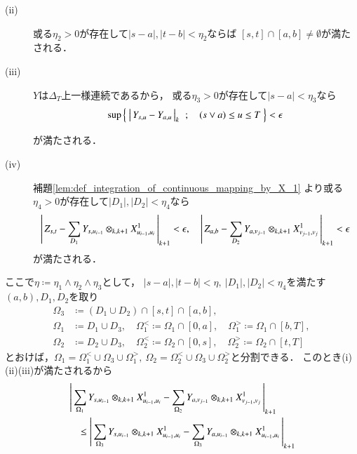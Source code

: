 \begin{prf}
\begin{description}
\begin{description}
					\item[(ii)] 或る$\eta_2 > 0$が存在して$|s-a|,|t-b| < \eta_2$ならば
						$[s,t] \cap [a,b] \neq \emptyset$が満たされる．
						
					\item[(iii)] $Y$は$\Delta_T$上一様連続であるから，
						或る$\eta_3 > 0$が存在して$|s-a| < \eta_3$なら
						\begin{align}
							\operatorname*{sup}_{} \left\{\ \left|\, Y_{s,u} - Y_{a,u}\, \right|_{k}\ \, ; \quad (s \vee a) \leq u \leq T\ \right\} < \epsilon
						\end{align}
						が満たされる．
						
					\item[(iv)] 補題\ref{lem:def_integration_of_continuous_mapping_by_X_1}
						より或る$\eta_4 > 0$が存在して$|D_1|,|D_2| < \eta_4$なら
						\begin{align}
							\left|\, Z_{s,t} - \sum_{D_1} Y_{s,u_{i-1}} \otimes_{k,k+1} X^1_{u_{i-1},u_i}\, \right|_{k+1} < \epsilon,
					\quad \left|\, Z_{a,b} - \sum_{D_2} Y_{a,v_{j-1}} \otimes_{k,k+1} X^1_{v_{j-1},v_j}\, \right|_{k+1} < \epsilon
						\end{align}
						が満たされる．
				\end{description}
				ここで$\eta \coloneqq \eta_1 \wedge \eta_2 \wedge \eta_3$として，
				$|s-a|,|t-b| < \eta,\ |D_1|,|D_2| < \eta_4$を満たす$(a,b),D_1,D_2$を取り
				\begin{align}
					\Omega_3 &\coloneqq (D_1 \cup D_2) \cap [s,t] \cap [a,b], \\
					\Omega_1 &\coloneqq D_1 \cup D_3,
						\quad \Omega_1^< \coloneqq \Omega_1 \cap [0,a],
						\quad \Omega_1^> \coloneqq \Omega_1 \cap [b,T], \\
					\Omega_2 &\coloneqq D_2 \cup D_3,
						\quad \Omega_2^< \coloneqq \Omega_2 \cap [0,s],
						\quad \Omega_2^> \coloneqq \Omega_2 \cap [t,T]
				\end{align}
				とおけば，$\Omega_1 = \Omega_1^< \cup \Omega_3 \cup \Omega_1^>,\ 
				\Omega_2 = \Omega_2^< \cup \Omega_3 \cup \Omega_2^>$と分割できる．
				このとき(i)(ii)(iii)が満たされるから
				\begin{align}
					&\compcrossnorm{\sum_{\Omega_1} Y_{s,u_{i-1}} \otimes_{k,k+1} X^1_{u_{i-1},u_i}
						- \sum_{\Omega_2} Y_{a,v_{j-1}} \otimes_{k,k+1} X^1_{v_{j-1},v_j}}{k+1} \\
					&\quad\leq \compcrossnorm{\sum_{\Omega_3} Y_{s,u_{i-1}} \otimes_{k,k+1} X^1_{u_{i-1},u_i}
						- \sum_{\Omega_3} Y_{a,u_{i-1}} \otimes_{k,k+1} X^1_{u_{i-1},u_i}}{k+1} \\

\end{align}
\end{description}
\end{prf}
